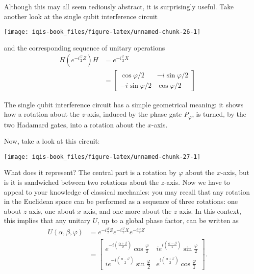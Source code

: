 \documentclass[fleqn]{article}
\newenvironment{idea}{\noindent}{\medskip}
\begin{document}
Although this may all seem tediously abstract, it is surprisingly useful.
Take another look at the single qubit interference circuit

\begin{center}\texttt{[image: iqis-book\_files/figure-latex/unnamed-chunk-26-1]} \end{center}

and the corresponding sequence of unitary operations
\[
  \begin{aligned}
    H \left(
      e^{-i\frac{\varphi}{2}Z}
    \right) H
    &= e^{-i\frac{\varphi}{2}X}
  \\&= \begin{bmatrix}
      \cos\varphi/2 & -i\sin\varphi/2
    \\-i\sin\varphi/2 & \cos\varphi/2
    \end{bmatrix}
  \end{aligned}
\]

\begin{idea}
The single qubit interference circuit has a simple geometrical meaning: it shows how a rotation about the \(z\)-axis, induced by the phase gate \(P_\varphi\), is turned, by the two Hadamard gates, into a rotation about the \(x\)-axis.

\end{idea}

Now, take a look at this circuit:

\begin{center}\texttt{[image: iqis-book\_files/figure-latex/unnamed-chunk-27-1]} \end{center}

What does it represent?
The central part is a rotation by \(\varphi\) about the \(x\)-axis, but is it is sandwiched between two rotations about the \(z\)-axis.
Now we have to appeal to your knowledge of classical mechanics: you may recall that any rotation in the Euclidean space can be performed as a sequence of three rotations: one about \(z\)-axis, one about \(x\)-axis, and one more about the \(z\)-axis.
In this context, this implies that any unitary \(U\), up to a global phase factor, can be written as
\[
  \begin{aligned}
    U(\alpha, \beta, \varphi)
    &= e^{-i\frac{\beta}{2}Z} e^{-i\frac{\varphi}{2}X} e^{-i\frac{\alpha}{2}Z}
  \\&= \begin{bmatrix}
      e^{-i\left(\frac{\alpha+\beta}{2}\right)}\cos\frac{\varphi}{2}
      & ie^{i\left(\frac{\alpha-\beta}{2}\right)}\sin\frac\varphi{2}
    \\ie^{-i\left(\frac{\alpha-\beta}{2}\right)}\sin\frac\varphi{2}
      & e^{i\left(\frac{\alpha+\beta}{2}\right)}\cos\frac\varphi{2}
    \end{bmatrix}.
  \end{aligned}
\]
\end{document}
